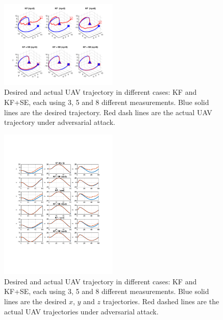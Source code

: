 \documentclass[../../thesis.tex]{subfiles}
\begin{document}
\begin{figure}
\center
\includegraphics[width=0.5\textwidth]{chapters/se_linear/figures/qh/uav_lqg_traj}
\caption{Desired and actual UAV trajectory in different cases: KF and KF+SE, each using 3, 5 and 8 different measurements. Blue solid lines are the desired trajectory. Red dash lines are the actual UAV trajectory under adversarial attack.}
\label{fig:ex_uav_traj}
\end{figure}
\begin{figure}
\center
\includegraphics[width=0.5\textwidth]{chapters/se_linear/figures/qh/uav_lqg_est}
\caption{Desired and actual UAV trajectory in different cases: KF and KF+SE, each using 3, 5 and 8 different measurements. Blue solid lines are the desired $x$, $y$ and $z$ trajectories. Red dashed lines are the actual UAV trajectories under adversarial attack.}
\label{fig:ex_uav_est}
\end{figure}

\end{document}
